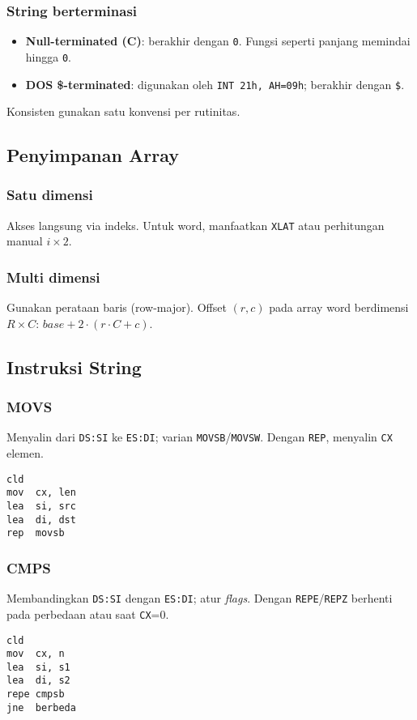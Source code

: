 \documentclass[../main.tex]{subfiles}
\begin{document}
\subsubsection{String berterminasi}
\begin{itemize}
  \item \textbf{Null-terminated (C)}: berakhir dengan \texttt{0}. Fungsi seperti panjang memindai hingga \texttt{0}.
  \item \textbf{DOS \$-terminated}: digunakan oleh \texttt{INT 21h, AH=09h}; berakhir dengan \texttt{\$}.
\end{itemize}
Konsisten gunakan satu konvensi per rutinitas.

\subsection{Penyimpanan Array}
\subsubsection{Satu dimensi}
Akses langsung via indeks. Untuk word, manfaatkan \texttt{XLAT} atau perhitungan manual \(i\times 2\).

\subsubsection{Multi dimensi}
Gunakan perataan baris (row-major). Offset \((r,c)\) pada array word berdimensi \(R\times C\): \(base + 2\cdot (r\cdot C + c)\).

\subsection{Instruksi String}
\subsubsection{MOVS}
Menyalin dari \texttt{DS:SI} ke \texttt{ES:DI}; varian \texttt{MOVSB}/\texttt{MOVSW}. Dengan \texttt{REP}, menyalin \texttt{CX} elemen.
\begin{verbatim}
cld
mov  cx, len
lea  si, src
lea  di, dst
rep  movsb
\end{verbatim}

\subsubsection{CMPS}
Membandingkan \texttt{DS:SI} dengan \texttt{ES:DI}; atur \textit{flags}. Dengan \texttt{REPE}/\texttt{REPZ} berhenti pada perbedaan atau saat \texttt{CX}=0.
\begin{verbatim}
cld
mov  cx, n
lea  si, s1
lea  di, s2
repe cmpsb
jne  berbeda
\end{verbatim}
\end{document}

